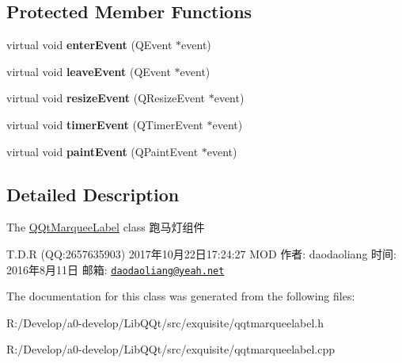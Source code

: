 \subsection*{Protected Member Functions}
\begin{DoxyCompactItemize}
\item 
\mbox{\label{class_q_qt_marquee_label_a11e6eeff217fdde1d07347c86585213b}} 
virtual void {\bfseries enter\+Event} (Q\+Event $\ast$event)
\item 
\mbox{\label{class_q_qt_marquee_label_a4f987cec7235ec91e7b4ab5691aab07f}} 
virtual void {\bfseries leave\+Event} (Q\+Event $\ast$event)
\item 
\mbox{\label{class_q_qt_marquee_label_ae72e915c9a92ce6496960bea478e15ae}} 
virtual void {\bfseries resize\+Event} (Q\+Resize\+Event $\ast$event)
\item 
\mbox{\label{class_q_qt_marquee_label_a56b4304e58c0ce9f791497a29d946c59}} 
virtual void {\bfseries timer\+Event} (Q\+Timer\+Event $\ast$event)
\item 
\mbox{\label{class_q_qt_marquee_label_add0a07a6afbaaed46d00e4b3f56fa4f6}} 
virtual void {\bfseries paint\+Event} (Q\+Paint\+Event $\ast$event)
\end{DoxyCompactItemize}


\subsection{Detailed Description}
The \mbox{\hyperlink{class_q_qt_marquee_label}{Q\+Qt\+Marquee\+Label}} class 跑马灯组件 

T.\+D.\+R (QQ\+:2657635903) 2017年10月22日17\+:24\+:27 M\+OD 作者\+: daodaoliang 时间\+: 2016年8月11日 邮箱\+: \href{mailto:daodaoliang@yeah.net}{\tt daodaoliang@yeah.\+net} 

The documentation for this class was generated from the following files\+:\begin{DoxyCompactItemize}
\item 
R\+:/\+Develop/a0-\/develop/\+Lib\+Q\+Qt/src/exquisite/qqtmarqueelabel.\+h\item 
R\+:/\+Develop/a0-\/develop/\+Lib\+Q\+Qt/src/exquisite/qqtmarqueelabel.\+cpp\end{DoxyCompactItemize}
